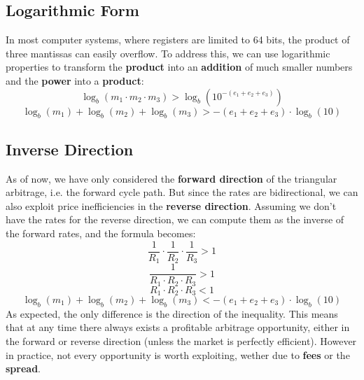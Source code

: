 \documentclass[11pt]{article}
\begin{document}
\subsection{Logarithmic Form}
In most computer systems, where registers are limited to 64 bits, the product of three mantissas can easily overflow. To address this, we can use logarithmic properties to transform the \textbf{product} into an \textbf{addition} of much smaller numbers and the \textbf{power} into a \textbf{product}:
\begin{equation}
    \log_b(m_1 \cdot m_2 \cdot m_3) > \log_b(10^{-(e_1 + e_2 + e_3)})
\end{equation}
\begin{equation}
    \log_b(m_1) + \log_b(m_2) + \log_b(m_3) > -(e_1 + e_2 + e_3) \cdot \log_b(10)
\end{equation}

\subsection{Inverse Direction}
As of now, we have only considered the \textbf{forward direction} of the triangular arbitrage, i.e. the forward cycle path. But since the rates are bidirectional, we can also exploit price inefficiencies in the \textbf{reverse direction}. Assuming we don't have the rates for the reverse direction, we can compute them as the inverse of the forward rates, and the formula becomes:
\setcounter{equation}{0}
\begin{equation}
    \frac{1}{R_{1}} \cdot \frac{1}{R_{2}} \cdot \frac{1}{R_{3}} > 1
\end{equation}
\begin{equation}
    \frac{1}{R_{1} \cdot R_{2} \cdot R_{3}} > 1
\end{equation}
\begin{equation}
    R_{1} \cdot R_{2} \cdot R_{3} < 1
\end{equation}
\begin{equation}
    \log_b(m_1) + \log_b(m_2) + \log_b(m_3) < -(e_1 + e_2 + e_3) \cdot \log_b(10)
\end{equation}
As expected, the only difference is the direction of the inequality. This means that at any time there always exists a profitable arbitrage opportunity, either in the forward or reverse direction (unless the market is perfectly efficient). However in practice, not every opportunity is worth exploiting, wether due to \textbf{fees} or the \textbf{spread}\textsuperscript{\cite{spread}}.
\end{document}
